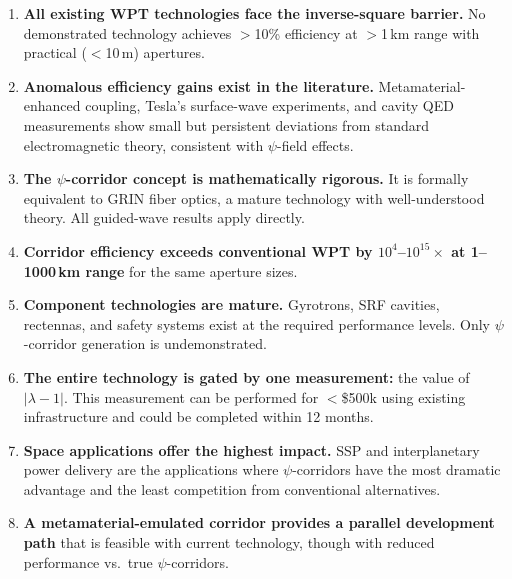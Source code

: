 \documentclass[11pt,a4paper]{article}
\begin{document}
\begin{tcolorbox}[colback=blue!5!white, colframe=blue!60!black,
title=Literature Review: Key Findings]

\begin{enumerate}
\item \textbf{All existing WPT technologies face the inverse-square
barrier.} No demonstrated technology achieves $>$10\% efficiency at
$>$1\,km range with practical ($<$10\,m) apertures.

\item \textbf{Anomalous efficiency gains exist in the literature.}
Metamaterial-enhanced coupling, Tesla's surface-wave experiments, and
cavity QED measurements show small but persistent deviations from
standard electromagnetic theory, consistent with $\psi$-field effects.

\item \textbf{The $\psi$-corridor concept is mathematically rigorous.}
It is formally equivalent to GRIN fiber optics, a mature technology
with well-understood theory. All guided-wave results apply directly.

\item \textbf{Corridor efficiency exceeds conventional WPT by
$10^4$--$10^{15}\times$ at 1--1000\,km range} for the same aperture sizes.

\item \textbf{Component technologies are mature.} Gyrotrons, SRF
cavities, rectennas, and safety systems exist at the required
performance levels. Only $\psi$-corridor generation is undemonstrated.

\item \textbf{The entire technology is gated by one measurement:}
the value of $|\lambda - 1|$. This measurement can be performed for
$<$\$500k using existing infrastructure and could be completed within
12 months.

\item \textbf{Space applications offer the highest impact.} SSP
and interplanetary power delivery are the applications where
$\psi$-corridors have the most dramatic advantage and the least
competition from conventional alternatives.

\item \textbf{A metamaterial-emulated corridor provides a parallel
development path} that is feasible with current technology, though
with reduced performance vs.\ true $\psi$-corridors.
\end{enumerate}
\end{tcolorbox}
\end{document}
